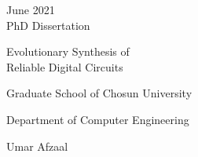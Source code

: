 \cleardoublepage
\thispagestyle{empty}

\vspace{25mm} \noindent
{\large \sffamily June 2021}\\
{\large \sffamily PhD Dissertation} 
\vspace*{20mm}
\begin{center}
\huge \sffamily
		Evolutionary Synthesis of \\
		Reliable Digital Circuits
\end{center}
\vspace{50mm}
\begin{center}
	{\LARGE \sffamily Graduate School of Chosun University}
\end{center}
\vspace{1mm}
\begin{center}
	{\Large \sffamily Department of Computer Engineering}
\end{center}
\vspace{1mm}
\begin{center}
	{\LARGE \sffamily Umar Afzaal}
\end{center}
\cleardoublepage
